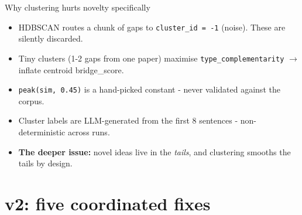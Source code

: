 \documentclass[10pt,aspectratio=169]{beamer}
\begin{document}
\begin{frame}{Why clustering hurts novelty specifically}
  \begin{itemize}
    \item HDBSCAN routes a chunk of gaps to \texttt{cluster\_id = -1} (noise).
      These are silently discarded.
    \item Tiny clusters (1-2 gaps from one paper) maximise
      \texttt{type\_complementarity} $\to$ inflate centroid bridge\_score.
    \item \texttt{peak(sim, 0.45)} is a hand-picked constant - never validated against the corpus.
    \item Cluster labels are LLM-generated from the first 8 sentences -
      non-deterministic across runs.
    \item \textbf{The deeper issue:} novel ideas live in the \emph{tails}, and clustering
      smooths the tails by design.
  \end{itemize}
\end{frame}


\section{v2: five coordinated fixes}
\end{document}
